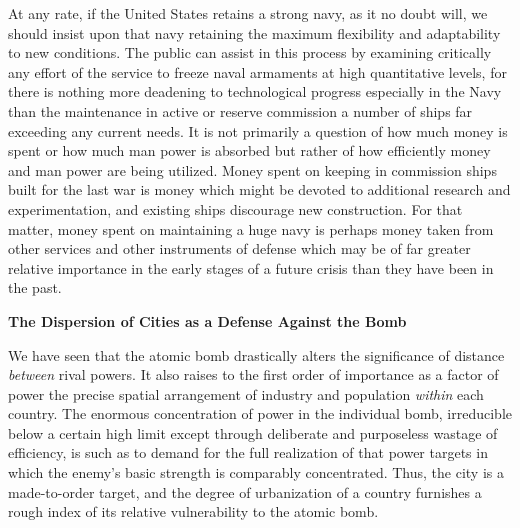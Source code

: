 At any rate, if the United States retains a strong navy, as it no doubt will, we should insist upon that navy retaining the maximum flexibility and adaptability to new conditions. The public can assist in this process by examining critically any effort of the service to freeze naval armaments at high quantitative levels, for there is nothing more deadening to technological progress especially in the Navy than the maintenance in active or reserve commission a number of ships far exceeding any current needs. It is not primarily a question of how much money is spent or how much man power is absorbed but rather of how efficiently money and man power are being utilized. Money spent on keeping in commission ships built for the last war is money which might be devoted to additional research and experimentation, and existing ships discourage new construction. For that matter, money spent on maintaining a huge navy is perhaps money taken from other services and other instruments of defense which may be of far greater relative importance in the early stages of a future crisis than they have been in the past.

\vspace{12pt}

\noindent\textbf{The Dispersion of Cities as a Defense Against the Bomb}

\vspace{10pt}

We have seen that the atomic bomb drastically alters the significance of distance \emph{between} rival powers. It also raises to the first order of importance as a factor of power the precise spatial arrangement of industry and population \emph{within} each country. The enormous concentration of power in the individual bomb, irreducible below a certain high limit except through deliberate and purposeless wastage of efficiency, is such as to demand for the full realization of that power targets in which the enemy's basic strength is comparably concentrated. Thus, the city is a made-to-order target, and the degree of urbanization of a country furnishes a rough index of its relative vulnerability to the atomic bomb.

